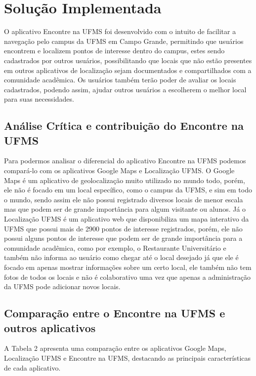 \section{Solução Implementada}
\label{sec:implementacao}

    O aplicativo Encontre na UFMS foi desenvolvido com o intuito de facilitar a navegação pelo campus da UFMS em Campo Grande, permitindo que usuários encontrem e localizem pontos de interesse dentro do campus, estes sendo cadastrados por outros usuários, possibilitando que locais que não estão presentes em outros aplicativos de localização sejam documentados e compartilhados com a comunidade acadêmica. Os usuários também terão poder de avaliar os locais cadastrados, podendo assim, ajudar outros usuários a escolherem o melhor local para suas necessidades.

\subsection{Análise Crítica e contribuição do Encontre na UFMS}
    Para podermos analisar o diferencial do aplicativo Encontre na UFMS podemos compará-lo com os aplicativos Google Maps e Localização UFMS. O Google Maps é um aplicativo de geolocalização muito utilizado no mundo todo, porém, ele não é focado em um local específico, como o campus da UFMS, e sim em todo o mundo, sendo assim ele não possui registrado diversos locais de menor escala mas que podem ser de grande importância para algum visitante ou alunos. Já o Localização UFMS é um aplicativo web que disponibiliza um mapa interativo da UFMS que possui mais de 2900 pontos de interesse registrados, porém, ele não possui alguns pontos de interesse que podem ser de grande importância para a comunidade acadêmica, como por exemplo, o Restaurante Universitário e também não informa ao usuário como chegar até o local desejado já que ele é focado em apenas mostrar informações sobre um certo local, ele também não tem fotos de todos os locais e não é colaborativo uma vez que apenas a administração da UFMS pode adicionar novos locais.

\newpage

\subsection{Comparação entre o Encontre na UFMS e outros aplicativos}
    A Tabela 2 apresenta uma comparação entre os aplicativos Google Maps, Localização UFMS e Encontre na UFMS, destacando as principais características de cada aplicativo.

